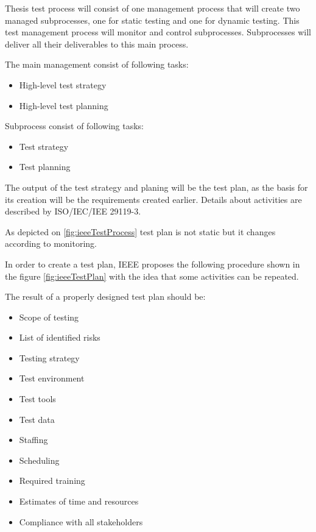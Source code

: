 Thesis test process will consist of one management process that will create two managed subprocesses, one for static testing and one for dynamic testing. This test management process will monitor and control subprocesses. Subprocesses will deliver all their deliverables to this main process.

The main management consist of following tasks:
\begin{itemize}
    \item High-level test strategy
    \item High-level test planning
\end{itemize}

Subprocess consist of following tasks:
\begin{itemize}
    \item Test strategy
    \item Test planning
\end{itemize}

The output of the test strategy and planing will be the test plan, as the basis for its creation will be the requirements created earlier. Details about activities are described by ISO/IEC/IEE 29119-3.

As depicted on \ref{fig:ieeeTestProcess} test plan is not static but it changes according to monitoring.


In order to create a test plan, IEEE proposes the following procedure shown in the figure \ref{fig:ieeeTestPlan} with the idea that some activities can be repeated.

The result of a properly designed test plan should be:
\begin{itemize}
    \item Scope of testing
    \item List of identified risks
    \item Testing strategy
    \item Test environment
    \item Test tools
    \item Test data
    \item Staffing
    \item Scheduling
    \item Required training
    \item Estimates of time and resources
    \item Compliance with all stakeholders
\end{itemize}

